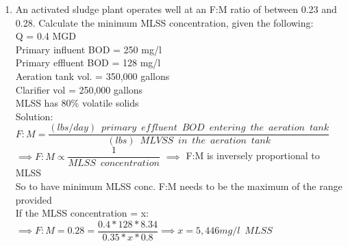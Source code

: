 \begin{enumerate}

\item An activated sludge plant operates well at an F:M ratio of between 0.23 and 0.28.  Calculate the minimum MLSS concentration, given the following:\\
Q = 0.4 MGD\\
Primary influent BOD = 250 mg/l\\
Primary effluent BOD = 128 mg/l\\
Aeration tank vol. = 350,000 gallons\\
Clarifier vol = 250,000 gallons\\
MLSS has 80\% volatile solids\\
\vspace{0.3cm}
Solution:\\
\vspace{0.3cm}
$F:M=\dfrac{(lbs/day) \enspace primary \enspace effluent  \enspace BOD \enspace entering \enspace the  \enspace aeration \enspace tank}{(lbs) \enspace MLVSS \enspace in \enspace the  \enspace aeration \enspace tank}$\\
\vspace{0.3cm}
$\implies F:M \propto \dfrac{1}{MLSS \enspace concentration}$  $\implies$ F:M is inversely proportional to MLSS\\
\vspace{0.3cm}
So to have minimum MLSS conc. F:M needs to be the maximum of the range provided\\
\vspace{0.3cm}
If the MLSS concentration = x:
$ \implies F:M=0.28=\dfrac{0.4*128*8.34}{0.35*x*0.8}\implies x = \boxed{5,446 mg/l \enspace MLSS}$


\newpage


\end{enumerate}
